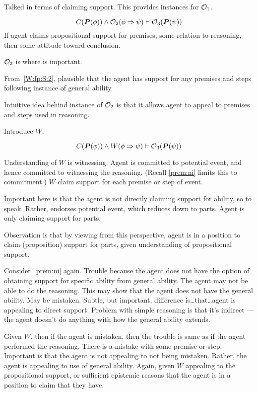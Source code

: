 \begin{note}
  Talked in terms of claiming support.
  This provides instances for \(\mathcal{O}_{1}\).

  \[C(\bm{P}(\phi)) \land \mathcal{O}_{2}(\phi \Rightarrow{} \psi) \vdash \mathcal{O}_{3}(\bm{P}(\psi))\]
  If agent claims propositional support for premises, some relation to reasoning, then some attitude toward conclusion.
\end{note}

\begin{note}[\(\geop{2}\)]
  \(\geop{2}\) is where \WR{} is important.

  From~\ref{W:fp:S:2}, plausible that the agent has support for any premises and steps following instance of general ability.

  Intuitive idea behind instance of \(\geop{2}\) is that it allows agent to appeal to premises and steps used in reasoning.

  Introduce \(W\).

  \[C(\bm{P}(\phi)) \land W(\phi \Rightarrow{} \psi) \vdash \mathcal{O}_{3}(\bm{P}(\psi))\]

  Understanding of \(W\) is witnessing.
  Agent is committed to potential event, and hence committed to witnessing the reasoning.
  (Recall \ref{prem:ni} limits this to commitment.)
  \(W\) claim support for each premise or step of event.

  Important here is that the agent is not directly claiming support for ability, so to speak.
  Rather, endorses potential event, which reduces down to parts.
  Agent is only claiming support for parts.

  Observation is that by viewing from this perspective, agent is in a position to claim (proposition) support for parts, given understanding of propositional support.

  Consider~\ref{prem:ni} again.
  Trouble because the agent does not have the option of obtaining support for specific ability from general ability.
  The agent may not be able to do the reasoning.
  This may show that the agent does not have the general ability.
  May be mistaken.
  Subtle, but important, difference is\dots that\dots agent is appealing to direct support.
  Problem with simple reasoning is that it's indirect --- the agent doesn't do anything with how the general ability extends.

  Given \(W\), then if the agent is mistaken, then the trouble is same as if the agent performed the reasoning.
  There is a mistake with some premise or step.
  Important is that the agent is not appealing to not being mistaken.
  Rather, the agent is appealing to use of general ability.
  Again, given \(W\) appealing to the propositional support, or sufficient epistemic reasons that the agent is in a position to claim that they have.


\end{note}
